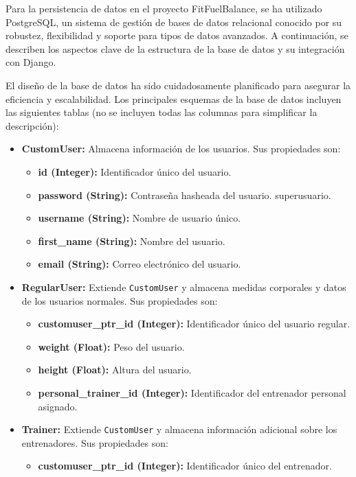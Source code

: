 Para la persistencia de datos en el proyecto FitFuelBalance, se ha utilizado PostgreSQL, un sistema de gestión de bases de datos relacional conocido por su robustez, flexibilidad y soporte para tipos de datos avanzados. A continuación, se describen los aspectos clave de la estructura de la base de datos y su integración con Django.

El diseño de la base de datos ha sido cuidadosamente planificado para asegurar la eficiencia y escalabilidad. Los principales esquemas de la base de datos incluyen las siguientes tablas (no se incluyen todas las columnas para simplificar la descripción):
\begin{itemize}
    \item \textbf{CustomUser:} Almacena información de los usuarios. Sus propiedades son:
    \begin{itemize}
        \item \textbf{id (Integer):} Identificador único del usuario.
        \item \textbf{password (String):} Contraseña hasheada del usuario. superusuario.
        \item \textbf{username (String):} Nombre de usuario único.
        \item \textbf{first\_name (String):} Nombre del usuario.
        \item \textbf{email (String):} Correo electrónico del usuario.
    \end{itemize}
    \item \textbf{RegularUser:} Extiende \texttt{CustomUser} y almacena medidas corporales y datos de los usuarios normales. Sus propiedades son:
    \begin{itemize}
        \item \textbf{customuser\_ptr\_id (Integer):} Identificador único del usuario regular.
        \item \textbf{weight (Float):} Peso del usuario.
        \item \textbf{height (Float):} Altura del usuario.
        \item \textbf{personal\_trainer\_id (Integer):} Identificador del entrenador personal asignado.
    \end{itemize}
    \item \textbf{Trainer:} Extiende \texttt{CustomUser} y almacena información adicional sobre los entrenadores. Sus propiedades son:
    \begin{itemize}
        \item \textbf{customuser\_ptr\_id (Integer):} Identificador único del entrenador.

\end{itemize}
\end{itemize}
